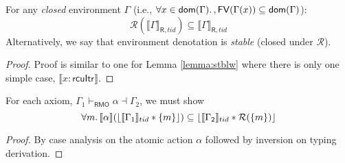 \begin{lemma}
For any \emph{closed} environment $\Gamma$ (i.e., $\forall x\in\mathsf{dom}(\Gamma)\ldotp, \mathsf{FV}(\Gamma(x))\subseteq\mathsf{dom}(\Gamma)$):
\[
\mathcal{R}(\llbracket\Gamma\rrbracket_{\mathsf{R},tid})\subseteq\llbracket\Gamma\rrbracket_{\mathsf{R},tid}
\]
Alternatively, we say that environment denotation is \emph{stable} (closed under $\mathcal{R}$).
\end{lemma}
\begin{proof}
Proof is similar to one for Lemma \ref{lemma:stblw} where there is only one simple case, $\llbracket x:\textsf{rcuItr} \rrbracket$. 
\end{proof}
\begin{theorem}
For each axiom, $\Gamma_{1} \vdash_{\textsf{RMO}} \alpha \dashv \Gamma_{2}$, we must show
\[
\forall m\ldotp   \llbracket \alpha \rrbracket  (\lfloor \llbracket \Gamma_{1} \rrbracket_{tid}  * \{m\} \rfloor )\subseteq  \lfloor \llbracket \Gamma_{2} \rrbracket_{tid} * \mathcal{R}(\{m\}) \rfloor
\]
\end{theorem}
\begin{proof}
By case analysis on the atomic action $\alpha$ followed by inversion on typing derivation.
\end{proof}

